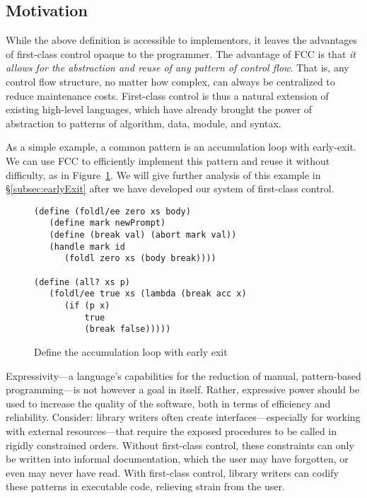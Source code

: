 \documentclass[11pt]{article}
\newcommand{\maybePage}{\null}
\begin{document}

\maybePage
\subsection{Motivation}

While the above definition is accessible to implementors, it leaves the advantages of first-class control opaque to the programmer.
The advantage of FCC is that \emph{it allows for the abstraction and reuse of any pattern of control flow}.
That is, any control flow structure, no matter how complex, can always be centralized to reduce maintenance costs.
First-class control is thus a natural extension of existing high-level languages, which have already brought the power of abstraction to patterns of algorithm, data, module, and syntax.

As a simple example, a common pattern is an accumulation loop with early-exit.
We can use FCC to efficiently implement this pattern and reuse it without difficulty, as in Figure~\ref{fig:ex-foldl/ee}.
We will give further analysis of this example in \S\ref{subsec:earlyExit} after we have developed our system of first-class control.

\begin{figure}[H]
\caption{Define the accumulation loop with early exit}
\label{fig:ex-foldl/ee}
\begin{verbatim}
(define (foldl/ee zero xs body)
   (define mark newPrompt)
   (define (break val) (abort mark val))
   (handle mark id
      (foldl zero xs (body break))))

(define (all? xs p)
   (foldl/ee true xs (lambda (break acc x)
      (if (p x)
          true
          (break false)))))
\end{verbatim}
\end{figure}

Expressivity---a language's capabilities for the reduction of manual, pattern-based programming---is not however a goal in itself.
Rather, expressive power should be used to increase the quality of the software, both in terms of efficiency and reliability.
Consider: library writers often create interfaces---especially for working with external resources---that require the exposed procedures to be called in rigidly constrained orders.
Without first-class control, these constraints can only be written into informal documentation, which the user may have forgotten, or even may never have read.
With first-class control, library writers can codify these patterns in executable code, relieving strain from the user.
\end{document}
